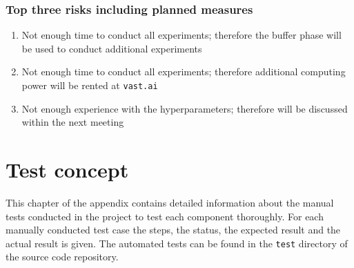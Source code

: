 \subsection{Top three risks including planned measures}
\begin{enumerate}
    \setlength\itemsep{0em}
    \item Not enough time to conduct all experiments; therefore the buffer phase will be used to conduct additional experiments
    \item Not enough time to conduct all experiments; therefore additional computing power will be rented at \texttt{vast.ai}
    \item Not enough experience with the hyperparameters; therefore will be discussed within the next meeting
\end{enumerate}

\clearpage
\landscapevalues

\chapter{Test concept}
\label{app:Test-Concept}
This chapter of the appendix contains detailed information about the manual tests conducted in the project to test each component thoroughly. For each manually conducted test case the steps, the status, the expected result and the actual result is given. The automated tests can be found in the \texttt{test} directory of the source code repository.

